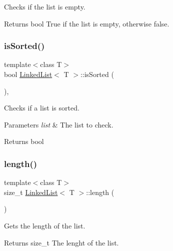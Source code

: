 Checks if the list is empty. 

\begin{DoxyReturn}{Returns}
bool True if the list is empty, otherwise false. 
\end{DoxyReturn}
\mbox{\label{classLinkedList_ae7e96c18033f13a7ddb22a4b5ba4cc7e}} 
\subsubsection{\texorpdfstring{is\+Sorted()}{isSorted()}}
{\footnotesize\ttfamily template$<$class T$>$ \\
bool \hyperlink{classLinkedList}{Linked\+List}$<$ T $>$\+::is\+Sorted (\begin{DoxyParamCaption}{ }\end{DoxyParamCaption})\hspace{0.3cm}{\ttfamily [inline]}, {\ttfamily [private]}}



Checks if a list is sorted. 


\begin{DoxyParams}{Parameters}
{\em list} & The list to check.\\
\hline
\end{DoxyParams}
\begin{DoxyReturn}{Returns}
bool 
\end{DoxyReturn}
\mbox{\label{classLinkedList_a4b766729a31801b6fafdb6170646d318}} 
\subsubsection{\texorpdfstring{length()}{length()}}
{\footnotesize\ttfamily template$<$class T$>$ \\
size\+\_\+t \hyperlink{classLinkedList}{Linked\+List}$<$ T $>$\+::length (\begin{DoxyParamCaption}{ }\end{DoxyParamCaption})\hspace{0.3cm}{\ttfamily [inline]}}



Gets the length of the list. 

\begin{DoxyReturn}{Returns}
size\+\_\+t The lenght of the list. 
\end{DoxyReturn}
\mbox{\label{classLinkedList_ae19ff3c4e501a9638fa5caf5cc9d5b05}} 

